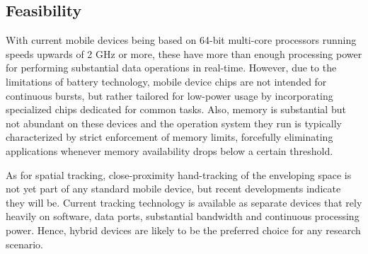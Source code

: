 \subsection{Feasibility}

With current mobile devices being based on 64-bit multi-core processors running speeds upwards of 2 GHz or more, these have more than enough processing power for performing substantial data operations  in real-time. However, due to the limitations of battery technology, mobile device chips are not intended for continuous bursts, but rather tailored for low-power usage by incorporating specialized chips dedicated for common tasks. Also, memory is substantial but not abundant on these devices and the operation system they run is typically characterized by strict enforcement of memory limits, forcefully eliminating applications whenever memory availability drops below a certain threshold.

As for spatial tracking,  close-proximity hand-tracking of the enveloping space is not yet part of any standard mobile device, but recent developments indicate they will be. Current tracking technology is available as separate devices that rely heavily on software, data ports, substantial  bandwidth and  continuous processing power. Hence, hybrid devices are likely to be the preferred choice for any research scenario.




\begin{comment}

\section{Expected analysis and results}

It is expected that the experiment will provide insight into whether or not interaction in off-screen space improves the user experience, given the particular approach taken. In addition, an analysis of how participants perceive and interact with the off-screen space through \AirSwipe\ gestures may lead to a subsequent exploration of a sub-hypothesis and possible refinement of the prototype. For instance, whether or not off-screen space, when implemented on a small portable device, correlates perfectly well with a simple imaginary extension of the display plane is an open question - one that is best explored through careful analysis of experimental data generated by actual human behavior. 

\end{comment}



